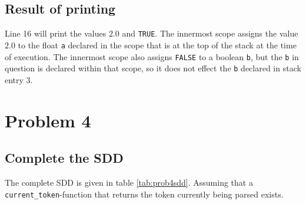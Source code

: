 \documentclass[twoside]{article}
\begin{document}
\begin{multicols}{2}
    \subsection{Result of printing}

    Line 16 will print the values $2.0$ and \texttt{TRUE}. The innermost scope assigns the value $2.0$ to the float \texttt{a} declared in the scope that is at the top of the stack at the time of execution. 
    The innermost scope also assigns \texttt{FALSE} to a boolean \texttt{b}, but the \texttt{b} in question is declared within that scope, so it does not effect the \texttt{b} declared in stack entry 3.

    \section{Problem 4}

    \subsection{Complete the SDD}

    The complete SDD is given in table \ref{tab:prob4sdd}. Assuming that a \texttt{current\_token}-function that returns the token currently being parsed exists.


\end{multicols}
\end{document}

